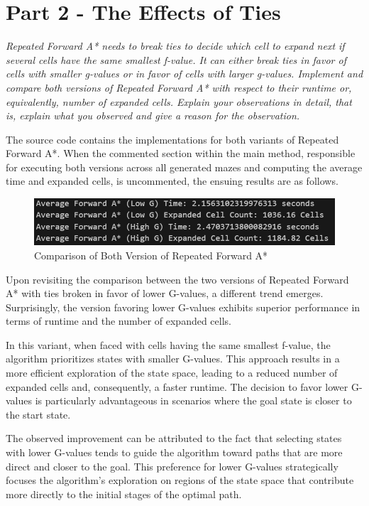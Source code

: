 \graphicspath{{Images/}}

\section{Part 2 - The Effects of Ties}

\textit{Repeated Forward A* needs to break ties to decide which cell to expand next if
several cells have the same smallest f-value. It can either break ties in favor of cells with smaller g-values or in favor of
cells with larger g-values. Implement and compare both versions of Repeated Forward A* with respect to their runtime or,
equivalently, number of expanded cells. Explain your observations in detail, that is, explain what you observed and give a
reason for the observation.}


The source code contains the implementations for both variants of Repeated Forward A*. When the commented section within the main method, responsible for executing both versions across all generated mazes and computing the average time and expanded cells, is uncommented, the ensuing results are as follows.

\begin{figure}[h]
    \centering
    \includegraphics[width=.85\linewidth]{imgs/Results of Both Forward A Methods.png}
    \caption{Comparison of Both Version of Repeated Forward A*}
    \label{fig:my_label}
\end{figure}

Upon revisiting the comparison between the two versions of Repeated Forward A* with ties broken in favor of lower G-values, a different trend emerges. Surprisingly, the version favoring lower G-values exhibits superior performance in terms of runtime and the number of expanded cells.

In this variant, when faced with cells having the same smallest f-value, the algorithm prioritizes states with smaller G-values. This approach results in a more efficient exploration of the state space, leading to a reduced number of expanded cells and, consequently, a faster runtime. The decision to favor lower G-values is particularly advantageous in scenarios where the goal state is closer to the start state.

The observed improvement can be attributed to the fact that selecting states with lower G-values tends to guide the algorithm toward paths that are more direct and closer to the goal. This preference for lower G-values strategically focuses the algorithm's exploration on regions of the state space that contribute more directly to the initial stages of the optimal path.

